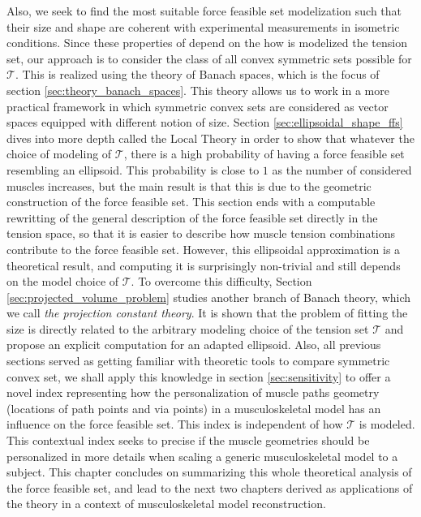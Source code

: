 Also, we seek to find the most suitable force feasible set modelization such that their size and shape are coherent with experimental measurements in isometric conditions. Since these properties of depend on the how is modelized the tension set, our approach is to consider the class of all convex symmetric sets possible for $\mathcal{T}$. This is realized using the theory of Banach spaces, which is the focus of section \ref{sec:theory_banach_spaces}. This theory allows us to work in a more practical framework in which symmetric convex sets are considered as vector spaces equipped with different notion of size. 
Section \ref{sec:ellipsoidal_shape_ffs} dives into more depth called the Local Theory in order to show that whatever the choice of modeling of $\mathcal{T}$, there is a high probability of having a force feasible set resembling an ellipsoid. This probability is close to $1$ as the number of considered muscles increases, but the main result is that this is due to the geometric construction of the force feasible set. This section ends with a computable rewritting of the general description of the force feasible set directly in the tension space, so that it is easier to describe how muscle tension combinations contribute to the force feasible set.  However, this ellipsoidal approximation is a theoretical result, and computing it is surprisingly non-trivial and still depends on the model choice of $\mathcal{T}$. To overcome this difficulty, Section \ref{sec:projected_volume_problem} studies another branch of Banach theory, which we call \emph{the projection constant theory}. It is shown that the problem of fitting the size is directly related to the arbitrary modeling choice of the tension set $\mathcal{T}$ and propose an explicit computation for an adapted ellipsoid. Also, all previous sections served as getting familiar with theoretic tools to compare symmetric convex set, we shall apply this knowledge in section \ref{sec:sensitivity} to offer a novel index representing how the personalization of muscle paths geometry (locations of path points and via points) in a musculoskeletal model has an influence on the force feasible set. This index is independent of how $\mathcal{T}$ is modeled. This contextual index seeks to precise if the muscle geometries should be personalized in more details when scaling a generic musculoskeletal model to a subject.
This chapter concludes on summarizing this whole theoretical analysis of the force feasible set, and lead to the next two chapters derived as applications of the theory in a context of musculoskeletal model reconstruction.

